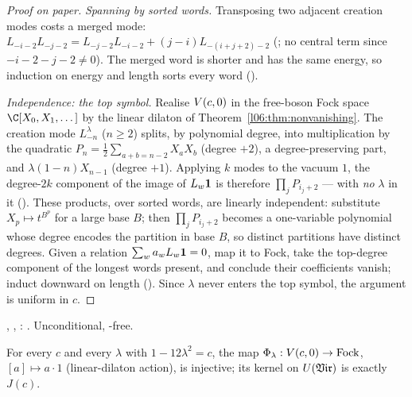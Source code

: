 \begin{proof}[Proof on paper]
\emph{Spanning by sorted words.} Transposing two adjacent creation modes costs a merged mode:
$L_{-i-2}L_{-j-2} = L_{-j-2}L_{-i-2} + (j-i)L_{-(i+j+2)-2}$ (; no central term since
$-i-2-j-2\ne0$). The merged word is shorter and has the same energy, so induction on energy and length
sorts every word ().

\emph{Independence: the top symbol.} Realise $V(c,0)$ in the free-boson Fock space
$\C[X_0,X_1,\dots]$ by the linear dilaton of Theorem~\ref{l06:thm:nonvanishing}. The creation mode
$L^\lambda_{-n}$ ($n\ge2$) splits, by polynomial degree, into multiplication by the quadratic
$P_n = \frac12\sum_{a+b=n-2}X_aX_b$ (degree $+2$), a degree-preserving part, and $\lambda(1-n)X_{n-1}$
(degree $+1$). Applying $k$ modes to the vacuum $1$, the degree-$2k$ component of the image of
$L_w\mathbf{1}$ is therefore $\prod_jP_{i_j+2}$ --- with \emph{no} $\lambda$ in it
(). These products, over sorted words, are linearly independent: substitute
$X_p\mapsto t^{B^p}$ for a large base $B$; then $\prod_jP_{i_j+2}$ becomes a one-variable polynomial
whose degree encodes the partition in base $B$, so distinct partitions have distinct degrees. Given a
relation $\sum_wa_wL_w\mathbf{1} = 0$, map it to Fock, take the top-degree component of the longest words
present, and conclude their coefficients vanish; induct downward on length
(). Since $\lambda$ never enters the top symbol, the argument is uniform in $c$.
\end{proof}

\begin{status}
\allowbreak{}\allowbreak{}, \allowbreak{}\allowbreak{}\allowbreak{},
\allowbreak{}\allowbreak{}\allowbreak{}\allowbreak{}: \lean{[propext, Classical.}\allowbreak{}\allowbreak\lean{sound]}.
Unconditional, -free.
\end{status}

\begin{theorem}\label{l06:thm:ffembed}
For every $c$ and every $\lambda$ with $1-12\lambda^2 = c$, the map $\Phi_\lambda:V(c,0)\to\mathrm{Fock}$,
$[a]\mapsto a\cdot1$ (linear-dilaton action), is injective; its kernel on $U(\mathfrak{Vir})$ is exactly $J(c)$.
\end{theorem}

